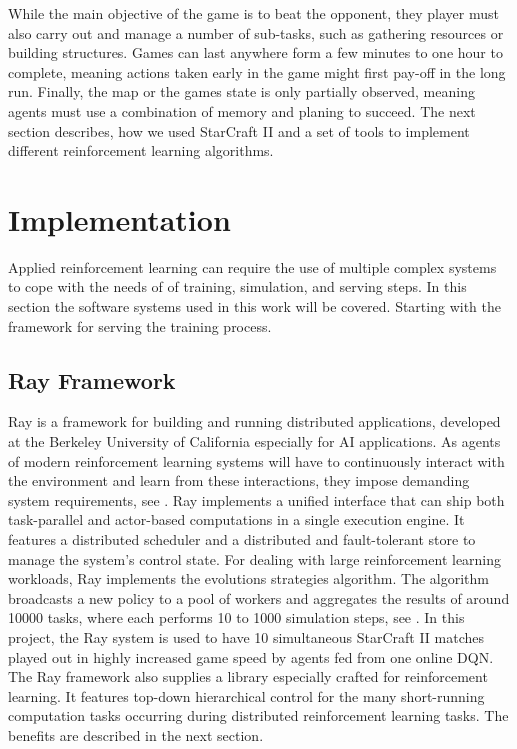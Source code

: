 \documentclass[12pt,a4paper]{article}
\begin{document}
While the main objective of the game is to beat the opponent, they player must also carry out and manage a number of sub-tasks, such as gathering resources or building structures. Games can last anywhere form a few minutes to one hour to complete, meaning actions taken early in the game might first pay-off in the long run. Finally, the map or the games state is only partially observed, meaning agents must use a combination of memory and planing to succeed.
The next section describes, how we used StarCraft II and a set of tools to implement different reinforcement learning algorithms.
\section{Implementation}
Applied reinforcement learning can require the use of multiple complex systems to cope with the needs of of training, simulation, and serving steps. In this section the software systems used in this work will be covered. Starting with the framework for serving the training process.
\subsection{Ray Framework}
Ray is a framework for building and running distributed applications, developed at the Berkeley University of California especially for AI applications. As agents of modern reinforcement learning systems will have to continuously interact with the environment and learn from these interactions, they impose demanding system requirements, see \cite{Moritz2017}. Ray implements a unified interface that can ship both task-parallel and actor-based computations in a single execution engine.
It features a distributed scheduler and a distributed and fault-tolerant store to manage the system's control state.
For dealing with large reinforcement learning workloads, Ray implements the evolutions strategies algorithm. The algorithm broadcasts a new policy to a pool of workers and aggregates the results of around 10000 tasks, where each performs 10 to 1000 simulation steps, see \cite{Moritz2017}.
In this project, the Ray system is used to have 10 simultaneous StarCraft II matches played out in highly increased game speed by agents fed from one online DQN.
The Ray framework also supplies a library especially crafted for reinforcement learning. It features top-down hierarchical control for the many short-running computation tasks occurring during distributed reinforcement learning tasks. The benefits are described in the next section.
\end{document}
